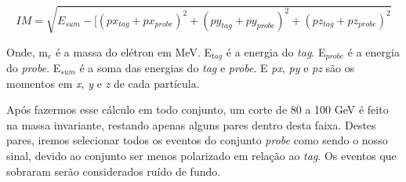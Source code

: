 \begin{equation}\label{eq:48}
  IM = \sqrt {{E_{sum}} - [{{\left( {p{x_{tag}} + p{x_{probe}}} \right)}^2} + {{\left( {p{y_{tag}} + p{y_{probe}}} \right)}^2} + {(p{z_{tag}} + p{z_{probe}})^2}}
\end{equation}

Onde, m${_e}$ é a massa do elétron em MeV. E${_{tag}}$ é a energia do \emph{tag}. E${_{probe}}$ é a energia do \emph{probe}. E${_{sum}}$ é a soma das energias do \emph{tag} e \emph{probe}. E \emph{px}, \emph{py} e \emph{pz} são os momentos em \emph{x}, \emph{y} e \emph{z} de cada partícula.
	
Após fazermos esse cálculo em todo conjunto, um corte de 80 a 100 GeV é feito na massa invariante, restando apenas alguns pares dentro desta faixa.  Destes pares, iremos selecionar todos os eventos do conjunto \emph{probe} como sendo o nosso sinal, devido ao conjunto ser menos polarizado em relação ao \emph{tag}. Os eventos que sobraram serão considerados ruído de fundo.


